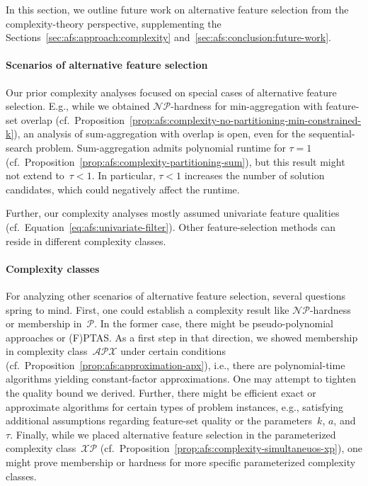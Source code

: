 \documentclass{article}
\theoremstyle{definition}
\begin{document}
In this section, we outline future work on alternative feature selection from the complexity-theory perspective, supplementing the Sections~\ref{sec:afs:approach:complexity} and~\ref{sec:afs:conclusion:future-work}.

\paragraph{Scenarios of alternative feature selection}

Our prior complexity analyses focused on special cases of alternative feature selection.
E.g., while we obtained $\mathcal{NP}$-hardness for min-aggregation with feature-set overlap (cf.~Proposition~\ref{prop:afs:complexity-no-partitioning-min-constrained-k}), an analysis of sum-aggregation with overlap is open, even for the sequential-search problem.
Sum-aggregation admits polynomial runtime for $\tau=1$ (cf.~Proposition~\ref{prop:afs:complexity-partitioning-sum}), but this result might not extend to~$\tau < 1$.
In particular, $\tau < 1$ increases the number of solution candidates, which could negatively affect the runtime.

Further, our complexity analyses mostly assumed univariate feature qualities (cf.~Equation~\ref{eq:afs:univariate-filter}).
Other feature-selection methods can reside in different complexity classes.

\paragraph{Complexity classes}

For analyzing other scenarios of alternative feature selection, several questions spring to mind.
First, one could establish a complexity result like $\mathcal{NP}$-hardness or membership in~$\mathcal{P}$.
In the former case, there might be pseudo-polynomial approaches or (F)PTAS.
As a first step in that direction, we showed membership in complexity class~$\mathcal{APX}$ under certain conditions (cf.~Proposition~\ref{prop:afs:approximation-apx}), i.e., there are polynomial-time algorithms yielding constant-factor approximations.
One may attempt to tighten the quality bound we derived.
Further, there might be efficient exact or approximate algorithms for certain types of problem instances, e.g., satisfying additional assumptions regarding feature-set quality or the parameters~$k$, $a$, and $\tau$.
Finally, while we placed alternative feature selection in the parameterized complexity class~$\mathcal{XP}$ (cf.~Proposition~\ref{prop:afs:complexity-simultaneuos-xp}), one might prove membership or hardness for more specific parameterized complexity classes.
\end{document}
